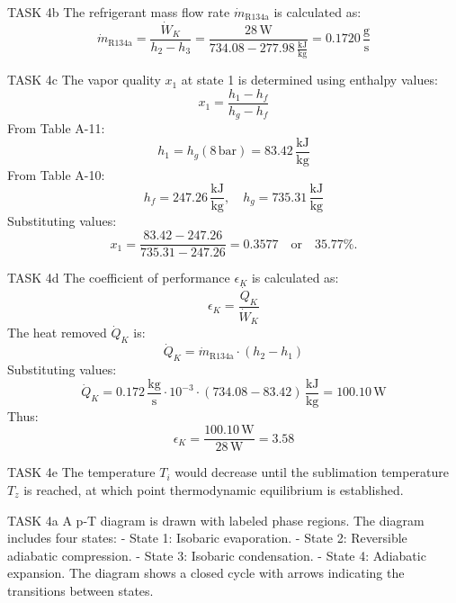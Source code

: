TASK 4b  
The refrigerant mass flow rate \( \dot{m}_{\text{R134a}} \) is calculated as:  
\[
\dot{m}_{\text{R134a}} = \frac{\dot{W}_K}{h_2 - h_3} = \frac{28 \, \text{W}}{734.08 - 277.98 \, \frac{\text{kJ}}{\text{kg}}} = 0.1720 \, \frac{\text{g}}{\text{s}}
\]  

TASK 4c  
The vapor quality \( x_1 \) at state 1 is determined using enthalpy values:  
\[
x_1 = \frac{h_1 - h_f}{h_g - h_f}
\]  
From Table A-11:  
\[
h_1 = h_g(8 \, \text{bar}) = 83.42 \, \frac{\text{kJ}}{\text{kg}}
\]  
From Table A-10:  
\[
h_f = 247.26 \, \frac{\text{kJ}}{\text{kg}}, \quad h_g = 735.31 \, \frac{\text{kJ}}{\text{kg}}
\]  
Substituting values:  
\[
x_1 = \frac{83.42 - 247.26}{735.31 - 247.26} = 0.3577 \quad \text{or} \quad 35.77\%.
\]  

TASK 4d  
The coefficient of performance \( \epsilon_K \) is calculated as:  
\[
\epsilon_K = \frac{\dot{Q}_K}{\dot{W}_K}
\]  
The heat removed \( \dot{Q}_K \) is:  
\[
\dot{Q}_K = \dot{m}_{\text{R134a}} \cdot (h_2 - h_1)
\]  
Substituting values:  
\[
\dot{Q}_K = 0.172 \, \frac{\text{kg}}{\text{s}} \cdot 10^{-3} \cdot (734.08 - 83.42) \, \frac{\text{kJ}}{\text{kg}} = 100.10 \, \text{W}
\]  
Thus:  
\[
\epsilon_K = \frac{100.10 \, \text{W}}{28 \, \text{W}} = 3.58
\]  

TASK 4e  
The temperature \( T_i \) would decrease until the sublimation temperature \( T_z \) is reached, at which point thermodynamic equilibrium is established.  

TASK 4a  
A p-T diagram is drawn with labeled phase regions. The diagram includes four states:  
- State 1: Isobaric evaporation.  
- State 2: Reversible adiabatic compression.  
- State 3: Isobaric condensation.  
- State 4: Adiabatic expansion.  
The diagram shows a closed cycle with arrows indicating the transitions between states.